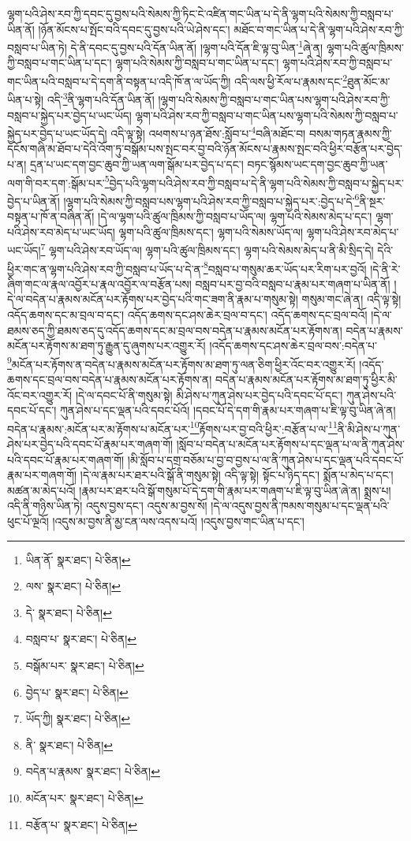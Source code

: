 ལྷག་པའི་ཤེས་རབ་ཀྱི་དབང་དུ་བྱས་པའི་སེམས་ཀྱི་ཏིང་ངེ་འཛིན་གང་ཡིན་པ་དེ་ནི་ལྷག་པའི་སེམས་ཀྱི་བསླབ་པ་ཡིན་ནོ། །ཉོན་མོངས་པ་སྤོང་བའི་དབང་དུ་བྱས་པའི་ཡེ་ཤེས་དང་། མཐོང་བ་གང་ཡིན་པ་དེ་ནི་ལྷག་པའི་ཤེས་རབ་ཀྱི་བསླབ་པ་ཡིན་ཏེ། དེ་ནི་དབང་དུ་བྱས་པའི་དོན་ཡིན་ནོ། །ལྷག་པའི་དོན་ཇི་ལྟ་བུ་ཡིན་\footnote{ཡིན་ནོ་  སྣར་ཐང་།  པེ་ཅིན། }ཞེ་ན། ལྷག་པའི་ཚུལ་ཁྲིམས་ཀྱི་བསླབ་པ་གང་ཡིན་པ་དང་། ལྷག་པའི་སེམས་ཀྱི་བསླབ་པ་གང་ཡིན་པ་དང་། ལྷག་པའི་ཤེས་རབ་ཀྱི་བསླབ་པ་གང་ཡིན་པའི་བསླབ་པ་དེ་དག་ནི་བསྟན་པ་འདི་ཁོ་ན་ལ་ཡོད་ཀྱི། འདི་ལས་ཕྱི་རོལ་པ་རྣམས་དང་\footnote{ལས་  སྣར་ཐང་།  པེ་ཅིན། }ཐུན་མོང་མ་ཡིན་པ་སྟེ། འདི་\footnote{དེ་  སྣར་ཐང་།  པེ་ཅིན། }ནི་ལྷག་པའི་དོན་ཡིན་ནོ། །ལྷག་པའི་སེམས་ཀྱི་བསླབ་པ་གང་ཡིན་པས་ལྷག་པའི་ཤེས་རབ་ཀྱི་བསླབ་པ་སྐྱེད་པར་བྱེད་པ་ཡང་ཡོད། ལྷག་པའི་ཤེས་རབ་ཀྱི་བསླབ་པ་གང་ཡིན་པས་ལྷག་པའི་སེམས་ཀྱི་བསླབ་པ་སྐྱེད་པར་བྱེད་པ་ཡང་ཡོད་དེ། འདི་ལྟ་སྟེ། འཕགས་པ་ཉན་ཐོས་:སློབ་པ་\footnote{བསླབ་པ་  སྣར་ཐང་།  པེ་ཅིན། }བཞི་མཐོང་བ། བསམ་གཏན་རྣམས་ཀྱི་དངོས་གཞི་མ་ཐོབ་པ་དེའི་འོག་ཏུ་བསྒོམ་པས་སྤང་བར་བྱ་བའི་ཉོན་མོངས་པ་རྣམས་སྤང་བའི་ཕྱིར་བརྩོན་པར་བྱེད་པ་ན། དྲན་པ་ཡང་དག་བྱང་ཆུབ་ཀྱི་ཡན་ལག་སྒོམ་པར་བྱེད་པ་དང་། བཏང་སྙོམས་ཡང་དག་བྱང་ཆུབ་ཀྱི་ཡན་ལག་གི་བར་དག་:སྒོམ་པར་\footnote{བསྒོམ་པར་  སྣར་ཐང་།  པེ་ཅིན། }བྱེད་པའི་ལྷག་པའི་ཤེས་རབ་ཀྱི་བསླབ་པ་དེ་ནི་ལྷག་པའི་སེམས་ཀྱི་བསླབ་པ་སྐྱེད་པར་བྱེད་པ་ཡིན་ནོ། །ལྷག་པའི་སེམས་ཀྱི་བསླབ་པས་ལྷག་པའི་ཤེས་རབ་ཀྱི་བསླབ་པ་སྐྱེད་པར་:བྱེད་པ་དེ་\footnote{བྱེད་པ་  སྣར་ཐང་།  པེ་ཅིན། }ནི་སྔར་བསྟན་པ་ཁོ་ན་བཞིན་ནོ། །དེ་ལ་ལྷག་པའི་ཚུལ་ཁྲིམས་ཀྱི་བསླབ་པ་ཡོད་ལ། ལྷག་པའི་སེམས་མེད་པ་དང་། ལྷག་པའི་ཤེས་རབ་མེད་པ་ཡང་ཡོད། ལྷག་པའི་ཚུལ་ཁྲིམས་དང་། ལྷག་པའི་སེམས་ཡོད་ལ། ལྷག་པའི་ཤེས་རབ་མེད་པ་ཡང་ཡོད།\footnote{ཡོད་ཀྱི།  སྣར་ཐང་།  པེ་ཅིན། } ལྷག་པའི་ཤེས་རབ་ཡོད་ལ། ལྷག་པའི་ཚུལ་ཁྲིམས་དང་། ལྷག་པའི་སེམས་མེད་པ་ནི་མི་སྲིད་དེ། དེའི་ཕྱིར་གང་ན་ལྷག་པའི་ཤེས་རབ་ཀྱི་བསླབ་པ་ཡོད་པ་དེ་ན་\footnote{ནི་  སྣར་ཐང་།  པེ་ཅིན། }བསླབ་པ་གསུམ་ཆར་ཡོད་པར་རིག་པར་བྱའོ། །དེ་ནི་རེ་ཞིག་གང་ལ་རྣལ་འབྱོར་པ་རྣལ་འབྱོར་ལ་བརྩོན་པས། བསླབ་པར་བྱ་བའི་བསླབ་པ་རྣམ་པར་གཞག་པ་ཡིན་ནོ། །དེ་ལ་བདེན་པ་རྣམས་མངོན་པར་རྟོགས་པར་བྱེད་པའི་གང་ཟག་ནི་རྣམ་པ་གསུམ་སྟེ། གསུམ་གང་ཞེ་ན། འདི་ལྟ་སྟེ། འདོད་ཆགས་དང་མ་བྲལ་བ་དང་། འདོད་ཆགས་དང་ཤས་ཆེར་བྲལ་བ་དང་། འདོད་ཆགས་དང་བྲལ་བའོ། །དེ་ལ་ཐམས་ཅད་ཀྱི་ཐམས་ཅད་དུ་འདོད་ཆགས་དང་མ་བྲལ་བས་བདེན་པ་རྣམས་མངོན་པར་རྟོགས་ན། བདེན་པ་རྣམས་མངོན་པར་རྟོགས་མ་ཐག་ཏུ་རྒྱུན་དུ་ཞུགས་པར་འགྱུར་རོ། །འདོད་ཆགས་དང་ཤས་ཆེར་བྲལ་བས་:བདེན་པ་\footnote{བདེན་པ་རྣམས་  སྣར་ཐང་།  པེ་ཅིན། }མངོན་པར་རྟོགས་ན་བདེན་པ་རྣམས་མངོན་པར་རྟོགས་མ་ཐག་ཏུ་ལན་ཅིག་ཕྱིར་འོང་བར་འགྱུར་རོ། །འདོད་ཆགས་དང་བྲལ་བས་བདེན་པ་རྣམས་མངོན་པར་རྟོགས་ན། བདེན་པ་རྣམས་མངོན་པར་རྟོགས་མ་ཐག་ཏུ་ཕྱིར་མི་འོང་བར་འགྱུར་རོ། །དེ་ལ་དབང་པོ་ནི་གསུམ་སྟེ། མི་ཤེས་པ་ཀུན་ཤེས་པར་བྱེད་པའི་དབང་པོ་དང་། ཀུན་ཤེས་པའི་དབང་པོ་དང་། ཀུན་ཤེས་པ་དང་ལྡན་པའི་དབང་པོའོ། །དབང་པོ་དེ་དག་གི་རྣམ་པར་གཞག་པ་ཇི་ལྟ་བུ་ཡིན་ཞེ་ན། བདེན་པ་རྣམས་:མངོན་པར་མ་རྟོགས་པ་མངོན་པར་\footnote{མངོན་པར་  སྣར་ཐང་།  པེ་ཅིན། }རྟོགས་པར་བྱ་བའི་ཕྱིར་:བརྩོན་པ་ལ་\footnote{བརྩོན་པ་  སྣར་ཐང་།  པེ་ཅིན། }ནི་མི་ཤེས་པ་ཀུན་ཤེས་པར་བྱེད་པའི་དབང་པོ་རྣམ་པར་གཞག་གོ། །སློབ་པ་བདེན་པ་མངོན་པར་རྟོགས་པ་དང་ལྡན་པ་ལ་ནི་ཀུན་ཤེས་པའི་དབང་པོ་རྣམ་པར་གཞག་གོ། །མི་སློབ་པ་དགྲ་བཅོམ་པ་བྱ་བ་བྱས་པ་ལ་ནི་ཀུན་ཤེས་པ་དང་ལྡན་པའི་དབང་པོ་རྣམ་པར་གཞག་གོ། །དེ་ལ་རྣམ་པར་ཐར་པའི་སྒོ་ནི་གསུམ་སྟེ། འདི་ལྟ་སྟེ། སྟོང་པ་ཉིད་དང་། སྨོན་པ་མེད་པ་དང་། མཚན་མ་མེད་པའོ། །རྣམ་པར་ཐར་པའི་སྒོ་གསུམ་པོ་དེ་དག་གི་རྣམ་པར་གཞག་པ་ཇི་ལྟ་བུ་ཡིན་ཞེ་ན། སྨྲས་པ། འདི་ནི་གཉིས་ཡིན་ཏེ། འདུས་བྱས་དང་། འདུས་མ་བྱས་སོ། །དེ་ལ་འདུས་བྱས་ནི་ཁམས་གསུམ་པ་དང་ལྡན་པའི་ཕུང་པོ་ལྔའོ། །འདུས་མ་བྱས་ནི་མྱ་ངན་ལས་འདས་པའོ། །འདུས་བྱས་གང་ཡིན་པ་དང་། 